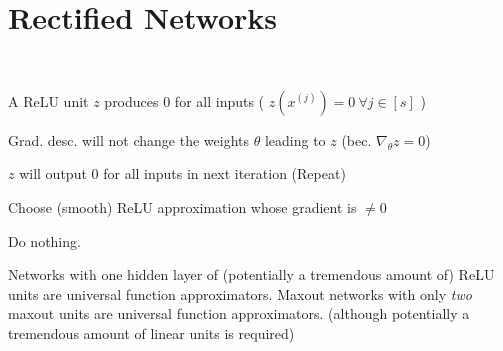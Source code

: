 \section{Rectified Networks}
\\ 
\begin{inparaitem}[$\color{mygreen} \triangleright$]
\item A ReLU unit $z$ produces $0$ for all inputs ( $z(x^{(j)}) = 0\  \forall j \in [s]$ )\\
\item Grad. desc. will not change the weights $\theta$ leading to $z$ (bec. $\nabla_\theta z = 0$)\\
\item $z$ will output 0 for all inputs in next iteration (Repeat)\\
\end{inparaitem}
 \begin{inparaitem}[$\color{mygreen} \triangleright$]
\item Choose (smooth) ReLU approximation whose gradient is $\ne 0$
\item Do nothing.
\end{inparaitem}
 Networks with one hidden layer of (potentially a tremendous amount of) ReLU units are universal function approximators.
 Maxout networks with only \textit{two} maxout units are universal function approximators. (although potentially a tremendous amount of linear units is required)